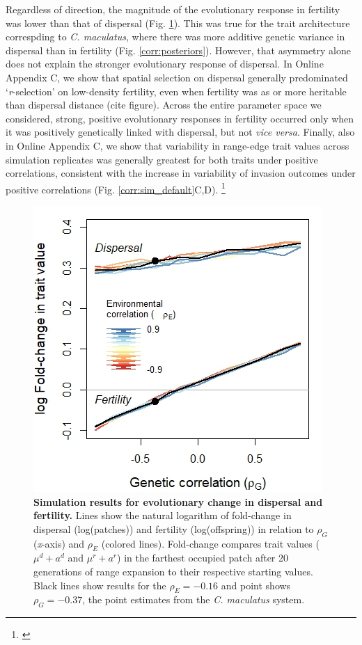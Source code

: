 \documentclass[11pt]{article}
\newcommand{\tom}[1]{{\textit{\color{WildStrawberry}{[#1]}}}}
\begin{document}
Regardless of direction, the magnitude of the evolutionary response in fertility was lower than that of dispersal (Fig. \ref{corr:traits}).
This was true for the trait architecture correspding to \textit{C. maculatus}, where there was more additive genetic variance in dispersal than in fertility (Fig. \ref{corr:posteriors}).
However, that asymmetry alone does not explain the stronger evolutionary response of dispersal.
In Online Appendix C, we show that spatial selection on dispersal generally predominated `\textit{r}-selection’ on low-density fertility, even when fertility was as or more heritable than dispersal distance (cite figure).
Across the entire parameter space we considered, strong, positive evolutionary responses in fertility occurred only when it was positively genetically linked with dispersal, but not \textit{vice versa}. 
Finally, also in Online Appendix C, we show that variability in range-edge trait values across simulation replicates was generally greatest for both traits under positive correlations, consistent with the increase in variability of invasion outcomes under positive correlations (Fig. \ref{corr:sim_default}C,D). \footnote{\tom{I still need to make this figure.}}

\begin{figure}[h!]
\centering
\includegraphics[width=0.5\linewidth]{Figures/trait_change}
\caption{\textbf{Simulation results for evolutionary change in dispersal and fertility.} Lines show the natural logarithm of fold-change in dispersal (log(patches)) and fertility (log(offspring)) in relation to $\rho_{G}$ (\textit{x}-axis) and $\rho_{E}$ (colored lines). 
Fold-change compares trait values ($\mu^{d} + a^{d}$ and $\mu^{r} + a^{r}$) in the farthest occupied patch after 20 generations of range expansion to their respective starting values. 
Black lines show results for the $\rho_{E} = -0.16$ and point shows $\rho_{G} = -0.37$, the point estimates from the \textit{C. maculatus} system.}
\label{corr:traits}
\end{figure}
\end{document}
